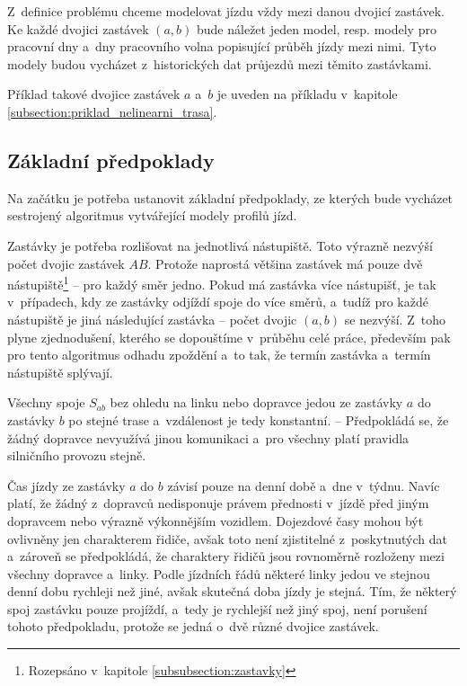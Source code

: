 \bigbreak

Z~definice problému chceme modelovat jízdu vždy mezi danou dvojicí zastávek. Ke každé dvojici zastávek $(a, b)$ bude náležet jeden model, resp. modely pro pracovní dny a~dny pracovního volna popisující průběh jízdy mezi nimi. Tyto modely budou vycházet z~historických dat průjezdů mezi těmito zastávkami.


\bigbreak

Příklad takové dvojice zastávek $a$ a~$b$ je uveden na příkladu v~kapitole \ref{subsection:priklad_nelinearni_trasa}.


\subsection{Základní předpoklady} \label{section:zakladni_predpoklady}

Na začátku je potřeba ustanovit základní předpoklady, ze kterých bude vycházet sestrojený algoritmus vytvářející modely profilů jízd.


\bigbreak

Zastávky je potřeba rozlišovat na jednotlivá nástupiště. Toto výrazně nezvýší počet dvojic zastávek $AB$. Protože naprostá většina zastávek má pouze dvě nástupiště\footnote{Rozepsáno v~kapitole \ref{subsubsection:zastavky}} -- pro každý směr jedno. Pokud má zastávka více nástupišť, je tak v~případech, kdy ze zastávky odjíždí spoje do více směrů, a~tudíž pro každé nástupiště je jiná následující zastávka -- počet dvojic $(a, b)$ se nezvýší. Z~toho plyne zjednodušení, kterého se dopouštíme v~průběhu celé práce, především pak pro tento algoritmus odhadu zpoždění a~to tak, že termín zastávka a~termín nástupiště splývají.


\bigbreak

Všechny spoje $S_{ab}$ bez ohledu na linku nebo dopravce jedou ze zastávky $a$ do zastávky $b$ po stejné trase a~vzdálenost je tedy konstantní. -- Předpokládá se, že žádný dopravce nevyužívá jinou komunikaci a~pro všechny platí pravidla silničního provozu stejně.


\bigbreak

Čas jízdy ze zastávky $a$ do $b$ závisí pouze na denní době a~dne v~týdnu. Navíc platí, že žádný z~dopravců nedisponuje právem přednosti v~jízdě před jiným dopravcem nebo výrazně výkonnějším vozidlem. Dojezdové časy mohou být ovlivněny jen charakterem řidiče, avšak toto není zjistitelné z~poskytnutých dat a~zároveň se předpokládá, že charaktery řidičů jsou rovnoměrně rozloženy mezi všechny dopravce a~linky. Podle jízdních řádů některé linky jedou ve stejnou denní dobu rychleji než jiné, avšak skutečná doba jízdy je stejná. Tím, že některý spoj zastávku pouze projíždí, a~tedy je rychlejší než jiný spoj, není porušení tohoto předpokladu, protože se jedná o~dvě různé dvojice zastávek.



